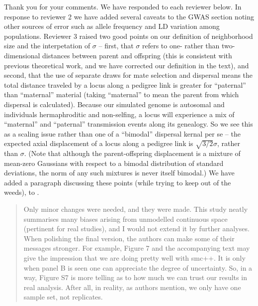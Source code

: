 Thank you for your comments. We have responded to each reviewer below. In response to reviewer 2 we have added several caveats to the GWAS section noting other sources of error such as allele frequency and LD variation among populations. Reviewer 3 raised two good points on our definition of neighborhood size and the interpetation of $\sigma$ -- first, that $\sigma$ refers to one- rather than two-dimensional distances between parent and offspring (this is consistent with previous theoretical work, and we have corrected our definition in the text), and second, that the use of separate draws for mate selection and dispersal means the total distance traveled by a locus along a pedigree link is greater for ``paternal'' than ``maternal'' material (taking ``maternal'' to mean the parent from which dispersal is calculated). Because our simulated genome is autosomal and individuals hermaphroditic and non-selfing, a locus will experience a mix of ``maternal'' and ``paternal'' transmission events along its genealogy. So we see this as a scaling issue rather than one of a ``bimodal'' dispersal kernal per se -- the expected axial displacement of a locus along a pedigree link is $\sqrt{3/2} \sigma$, rather than $\sigma$.
(Note that although the parent-offspring displacement is a mixture of mean-zero Gaussians
with respect to a bimodal distribution of standard deviations,
the norm of any such mixtures is never itself bimodal.)
We have added a paragraph discussing these points (while trying to keep out of the weeds),
to .





\begin{quote}
Only minor changes were needed, and they were made. This study neatly summarises many biases arising from unmodelled continuous space (pertinent for real studies), and I would not extend it by further analyses. When polishing the final version, the authors can make some of their messages stronger. For example, Figure 7 and the accompanying text may give the impression that we are doing pretty well with smc++. It is only when panel B is seen one can appreciate the degree of uncertainty. So, in a way, Figure S7 is more telling as to how much we can trust our results in real analysis. After all, in reality, as authors mention, we only have one sample set, not replicates.
\end{quote}

